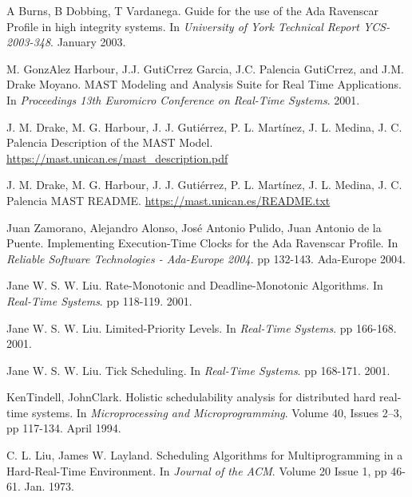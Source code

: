 \documentclass{article}
\begin{document}
\begin{thebibliography}{1}

A Burns, B Dobbing, T Vardanega.
\newblock Guide for the use of the Ada Ravenscar Profile in high integrity systems.
\newblock In {\em University of York Technical Report YCS-2003-348}. January 2003.

M. GonzAlez Harbour, J.J. GutiCrrez Garcia, J.C. Palencia GutiCrrez, and J.M. Drake Moyano.
\newblock MAST Modeling and Analysis Suite for Real Time Applications.
\newblock In {\em Proceedings 13th Euromicro Conference on Real-Time Systems}. 2001.

J. M. Drake, M. G. Harbour, J. J. Gutiérrez, P. L. Martínez, J. L. Medina, J. C. Palencia
\newblock Description of the MAST Model.
\newblock \url{https://mast.unican.es/mast_description.pdf}

J. M. Drake, M. G. Harbour, J. J. Gutiérrez, P. L. Martínez, J. L. Medina, J. C. Palencia
\newblock MAST README.
\newblock \url{https://mast.unican.es/README.txt}

Juan Zamorano, Alejandro Alonso, José Antonio Pulido, Juan Antonio de la Puente.
\newblock Implementing Execution-Time Clocks for the Ada Ravenscar Profile.
\newblock In {\em Reliable Software Technologies - Ada-Europe 2004}. pp 132-143. Ada-Europe 2004.

Jane W. S. W. Liu.
\newblock Rate-Monotonic and Deadline-Monotonic Algorithms.
\newblock In {\em Real-Time Systems}. pp 118-119. 2001.

Jane W. S. W. Liu.
\newblock Limited-Priority Levels.
\newblock In {\em Real-Time Systems}. pp 166-168. 2001.

Jane W. S. W. Liu.
\newblock Tick Scheduling.
\newblock In {\em Real-Time Systems}. pp 168-171. 2001.

KenTindell, JohnClark.
\newblock Holistic schedulability analysis for distributed hard real-time systems.
\newblock In {\em Microprocessing and Microprogramming}. Volume 40, Issues 2–3, pp 117-134. April 1994.

C. L. Liu, James W. Layland.
\newblock Scheduling Algorithms for Multiprogramming in a Hard-Real-Time Environment.
\newblock In {\em Journal of the ACM}. Volume 20 Issue 1, pp 46-61. Jan. 1973.


\end{thebibliography}
\end{document}
